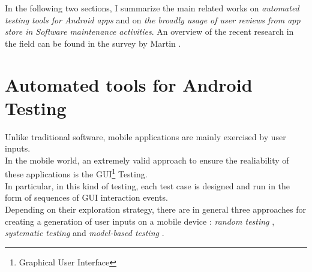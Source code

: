 In the following two sections, I summarize the main related works on \textit{automated testing tools for Android apps} and on \textit{the broadly usage of user reviews from app store in Software maintenance activities}. 
An overview of the recent research in the field can be found in the survey by Martin \etal \cite{Martin:tse2017}. 
\section{Automated tools for Android Testing}

Unlike traditional software, mobile applications are mainly exercised by user inputs. \\ 
In the mobile world, an extremely valid approach to ensure the realiability of these applications is the GUI\footnote{Graphical User Interface} Testing. \\ 
In particular, in this kind of testing, each test case is designed and run in the form of sequences of GUI interaction events.  \\
Depending on their exploration strategy, there are in general three approaches for creating a generation of user inputs on a mobile device \cite{dynodroid, areWeThereYet}: \textit{random testing} \cite{dynodroid, monkey}, \textit{systematic testing} \cite{evodroid} and \textit{model-based testing} \cite{mobiguitar, SwiftHand, mining}. 
